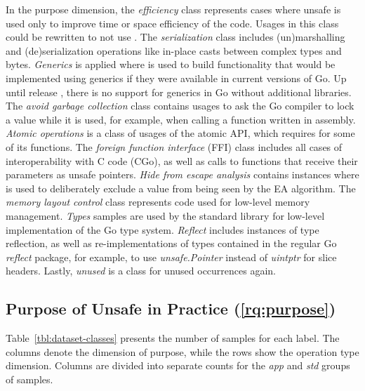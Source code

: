 In the purpose dimension, the \textit{efficiency} class represents cases where unsafe is used only to improve time or
space efficiency of the code.
Usages in this class could be rewritten to not use \unsafe{}.
The \textit{serialization} class includes (un)marshalling and (de)serialization operations like in-place casts between
complex types and bytes.
\textit{Generics} is applied where \unsafe{} is used to build functionality that would be implemented using generics if
they were available in current versions of Go.
Up until release , there is no support for generics in Go without additional libraries.
The \textit{avoid garbage collection} class contains usages to ask the Go compiler to lock a value while it is used, for
example, when calling a function written in assembly.
\textit{Atomic operations} is a class of usages of the atomic \acrshort{API}, which requires \unsafe{} for some of its
functions.
The \textit{foreign function interface} (\acrshort{FFI}) class includes all cases of interoperability with C code (CGo),
as well as calls to functions that receive their parameters as unsafe pointers.
\textit{Hide from escape analysis} contains instances where \unsafe{} is used to deliberately exclude a value from being
seen by the \acrshort{EA} algorithm.
The \textit{memory layout control} class represents code used for low-level memory management.
\textit{Types} samples are used by the standard library for low-level implementation of the Go type system.
\textit{Reflect} includes instances of type reflection, as well as re-implementations of types contained in the regular
Go \textit{reflect} package, for example, to use \textit{unsafe.Pointer} instead of \textit{uintptr} for slice headers.
Lastly, \textit{unused} is a class for unused occurrences again.



\subsection{Purpose of Unsafe in Practice (\ref{rq:purpose})}\label{subsec:go-geiger:qualitative-evaluation:purpose}

Table~\ref{tbl:dataset-classes} presents the number of samples for each label.
The columns denote the dimension of purpose, while the rows show the operation type dimension.
Columns are divided into separate counts for the \textit{app} and \textit{std} groups of samples.

